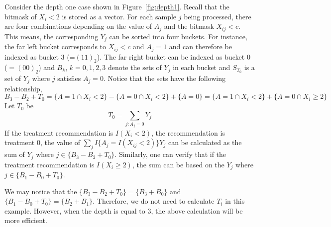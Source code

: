 Consider the depth one case shown in Figure~\ref{fig:depth1}. Recall
that the bitmask of $X_i < 2$ is stored as a vector. For each sample
$j$ being processed, there are four combinations depending on the
value of $A_j$ and the bitmask $X_{ij} < c$. This means, the
corresponding $Y_j$ can be sorted into four buckets. For instance, the
far left bucket corresponds to $X_{ij} < c$ and $A_j=1$ and can
therefore be indexed as bucket 3 (=$(11)_2$). The far right bucket can
be indexed as bucket 0 ($=(00)_2$) and $B_k$, $k=0,1,2,3$ denote the
sets of $Y_j$ in each bucket and $S_{T_0}$ is a set of $Y_j$ where $j$
satisfies $A_j=0$.  Notice that the sets have the following
relationship,
\[B_3 - B_2 + T_0 
=  \{A = 1 \cap X_i < 2\} - \{A = 0 \cap X_i < 2\} + \{A = 0\}
= \{A = 1 \cap X _i< 2\} + \{A = 0 \cap X_i \geq 2\}
\]
%
Let $T_0$ be
\[
T_0 = \sum_{j:A_j = 0} Y_j
\]
If the treatment recommendation is $I(X_i < 2)$, the recommendation is
treatment 0, the value of $\sum_j I\{A_j=I(X_{ij}<2)\}Y_j$ can be
calculated as the sum of $Y_j$ where $j \in \{B_3 - B_2 + T_0\}$.
Similarly, one can verify that if the treatment recommendation is
$I(X_i \geq 2)$, the sum can be based on the $Y_j$ where $j \in \{B_1
- B_0 + T_0\}$.

We may notice that the $\{B_3 - B_2 + T_0\}=\{B_3+B_0\}$ and $\{B_1 -
B_0 + T_0\}=\{B_2+B_1\}$. Therefore, we do not need to calculate $T_i$
in this example. However, when the depth is equal to 3, the above
calculation will be more efficient.

